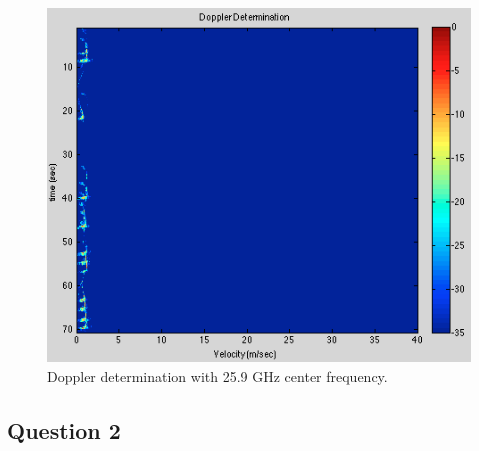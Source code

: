 \documentclass{article}
\begin{document}
\begin{figure}[ht]
\begin{minipage}[b]{0.33\linewidth}
\label{fig:f_c_reduced}
\end{minipage}
\begin{minipage}[b]{0.33\linewidth}
\centering
\includegraphics[width=\textwidth]{Figures/f_c_increased.png}
\caption{Doppler determination with 25.9 GHz center frequency.}
\label{fig:f_c_increased}
\end{minipage}
\end{figure}

\subsection{Question 2}
\label{zpad_doppler}
\end{document}
